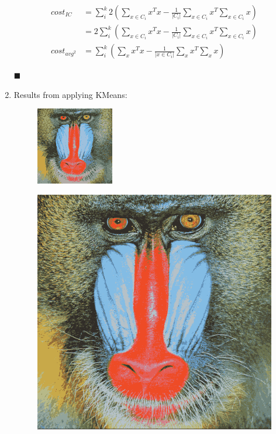 \documentclass{article}
\begin{document}
\begin{enumerate}
\begin{align*}
  cost_{IC} &= \sum\limits_i^k 2(\sum\limits_{x \in C_i} x^Tx - \frac 1 {|C_i|} \sum\limits_{x \in C_i} x^T \sum\limits_{x \in C_i} x)\\
  &= 2\sum\limits_i^k(\sum\limits_{x \in C_i} x^Tx - \frac 1 {|C_i|} \sum\limits_{x \in C_i} x^T \sum\limits_{x \in C_i} x)\\
  cost_{avg^2} &= \sum\limits_i^k(\sum\limits_{x} x^Tx - \frac 1 {|{x \in C_i}|} \sum\limits_{x} x^T \sum\limits_{x} x)
\end{align*}

$\blacksquare$

\item Results from applying KMeans:

\begin{figure}[H]
  \includegraphics{../output/small.png}
\end{figure}
\begin{figure}[H]
\includegraphics{../output/large.png}
\end{figure}


\end{enumerate}
\end{document}
